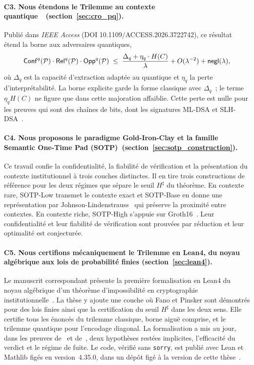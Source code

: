 \begin{sloppypar}
\paragraph{C3. Nous \'etendons le Trilemme au contexte quantique~\cite{MINKA2026PQCRO}~(section~\ref{sec:cro_pq}).}
Publi\'e dans \emph{IEEE Access} (DOI 10.1109/ACCESS.2026.3722742), ce r\'esultat \'etend la borne aux adversaires quantiques,
\begin{equation}
  \mathsf{Conf}^q(\mathcal{P})\cdot\mathsf{Rel}^q(\mathcal{P})\cdot\mathsf{Opp}^q(\mathcal{P})
  \;\leq\;
  \frac{\Delta_q + \eta_q \cdot H(C)}{\lambda} + O(\lambda^{-2}) + \mathsf{negl}(\lambda),
\end{equation}
o\`u $\Delta_q$ est la capacit\'e d'extraction adapt\'ee au quantique et $\eta_q$ la perte d'interpr\'etabilit\'e. La borne explicite garde la forme classique avec $\Delta_q$~; le terme $\eta_q H(C)$ ne figure que dans cette majoration affaiblie. Cette perte est nulle pour les preuves qui sont des cha\^ines de bits, dont les signatures ML-DSA et SLH-DSA~\cite{Dilithium2022,SPHINCS2022}.

\paragraph{C4. Nous proposons le paradigme Gold-Iron-Clay et la famille Semantic One-Time Pad (SOTP)~(section~\ref{sec:sotp_construction}).}
Ce travail confie la confidentialit\'e, la fiabilit\'e de v\'erification et la pr\'esentation du contexte institutionnel \`a trois couches distinctes. Il en tire trois constructions de r\'ef\'erence pour les deux r\'egimes que s\'epare le seuil $H^\sharp$ du th\'eor\`eme. En contexte rare, SOTP-Low transmet le contexte exact et SOTP-Base en donne une repr\'esentation par Johnson-Lindenstrauss~\cite{JohnsonLindenstrauss84} qui pr\'eserve la proximit\'e entre contextes. En contexte riche, SOTP-High s'appuie sur Groth16~\cite{Groth16}. Leur confidentialit\'e et leur fiabilit\'e de v\'erification sont prouv\'ees par r\'eduction et leur optimalit\'e est conjectur\'ee.

\paragraph{C5. Nous certifions m\'ecaniquement le Trilemme en Lean4, du noyau
alg\'ebrique aux lois de probabilit\'e finies (section~\ref{sec:lean4}).}
Le manuscrit correspondant pr\'esente la premi\`ere formalisation en Lean4 du noyau alg\'ebrique d'un th\'eor\`eme d'impossibilit\'e en cryptographie institutionnelle~\cite{moura2015lean,Lean4,Mathlib}. La th\`ese y ajoute une couche o\`u Fano et Pinsker sont d\'emontr\'es pour des lois finies ainsi que la certification du seuil $H^\sharp$ dans les deux sens. Elle certifie tous les \'enonc\'es du trilemme classique, borne aigu\"e comprise, et le trilemme quantique pour l'encodage diagonal. La formalisation a mis au jour, dans les preuves de~\cite{MINKA2026CRO} et de~\cite{MINKA2026PQCRO}, deux hypoth\`eses rest\'ees implicites, l'efficacit\'e du verdict et le r\'egime de fuite. Le code, v\'erifi\'e sans \texttt{sorry}, est publi\'e avec Lean et Mathlib fig\'es en version~4.35.0, dans un d\'ep\^ot fig\'e \`a la version de cette th\`ese~\cite{CROTrilemmaDepot}.


\end{sloppypar}
